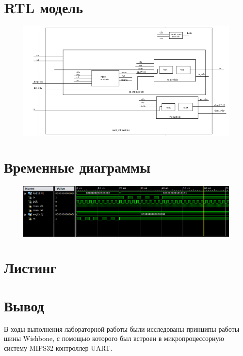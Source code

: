 \documentclass[a4paper, 10pt]{article}
\begin{document}
     \section*{RTL модель}
        \begin{landscape}
            \begin{figure}[ht]
                \includegraphics{../images/rtl_uart.png}
            \end{figure}
        \end{landscape}
     \section*{Временные диаграммы}
        \begin{figure}[h!]
            \includegraphics[scale=0.5]{../images/echo_mode.png}
        \end{figure}

     \section*{Листинг}
        
        
        
        
        
        

    \section*{Вывод}
        В ходы выполнения лабораторной работы были исследованы принципы работы
        шины Wishbone, с помощью которого был встроен в микропроцессорную 
        систему MIPS32 контроллер UART.
\end{document}
